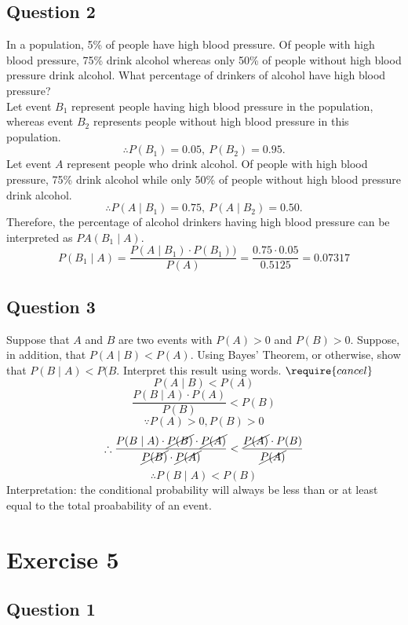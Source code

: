 \documentclass[
]{book}
\begin{document}
\section{Question 2}\label{question-2-2}

In a population, 5\% of people have high blood pressure. Of people with high blood pressure, 75\% drink alcohol whereas only 50\% of people without high blood pressure drink alcohol. What percentage of drinkers of alcohol have high blood pressure?\\

Let event \(B_1\) represent people having high blood pressure in the population, whereas event \(B_2\) represents people without high blood pressure in this population.
\[\therefore P(B_1) = 0.05, \ P(B_2) = 0.95.\]
Let event \(A\) represent people who drink alcohol. Of people with high blood pressure, 75\% drink alcohol while only 50\% of people without high blood pressure drink alcohol.
\[\therefore P(A \mid B_1) = 0.75, \ P(A \mid B_2) = 0.50.\]
Therefore, the percentage of alcohol drinkers having high blood pressure can be interpreted as \(PA(B_1 \mid A)\).
\[P(B_1 \mid A) = \frac{P(A \mid B_1) \cdot P(B_1))}{P(A)} = \frac{0.75 \cdot 0.05}{0.5125} = 0.07317\]

\section{Question 3}\label{question-3-2}

Suppose that \(A\) and \(B\) are two events with \(P(A) > 0\) and \(P(B) > 0\). Suppose, in addition, that \(P(A \mid B) < P(A)\). Using Bayes' Theorem, or otherwise, show that \(P(B \mid A) < P(B\). Interpret this result using words.
\(\require{cancel}\)
\[P(A \mid B) < P(A)\]
\[\frac{P(B \mid A) \cdot P(A)}{P(B)} < P(B)\]
\[\because P(A) > 0, P(B) > 0\]
\[\therefore \frac{P(B \mid A) \cdot \cancel{P(B)} \cdot \cancel{P(A)}}{\cancel{P(B)} \cdot \cancel{P(A)}} < \frac{\cancel{P(A)} \cdot P(B)}{\cancel{P(A)}}\]
\[\therefore P(B \mid A) < P(B)\]
Interpretation: the conditional probability will always be less than or at least equal to the total proabability of an event.

\chapter{Exercise 5}\label{exercise-5}

\section{Question 1}\label{question-1-3}
\end{document}
